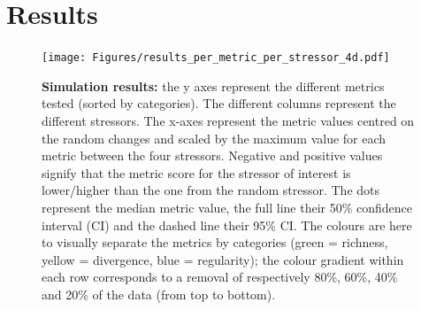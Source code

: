 \documentclass[12pt,letterpaper]{article}
\providecommand{\DIFaddbeginFL}{} %
\providecommand{\DIFdelbeginFL}{} %
\providecommand{\DIFdelendFL}{} %
\newcommand{\DIFscaledelfig}{0.5}
\newlength{\DIFdelgraphicswidth} %
\newlength{\DIFdelgraphicsheight} %
\newcommand{\DIFaddincludegraphics}[2][]{{\color{blue}\fbox{\DIFOincludegraphics[#1]{#2}}}} %
\newcommand{\DIFdelincludegraphics}[2][]{%
\sbox{\DIFdelgraphicsbox}{\DIFOincludegraphics[#1]{#2}}%
\settoboxwidth{\DIFdelgraphicswidth}{\DIFdelgraphicsbox} %
\settoboxtotalheight{\DIFdelgraphicsheight}{\DIFdelgraphicsbox} %
\scalebox{\DIFscaledelfig}{%
\parbox[b]{\DIFdelgraphicswidth}{\usebox{\DIFdelgraphicsbox}\\[-\baselineskip] \rule{\DIFdelgraphicswidth}{0em}}\llap{\resizebox{\DIFdelgraphicswidth}{\DIFdelgraphicsheight}{%
\setlength{\unitlength}{\DIFdelgraphicswidth}%
\begin{picture}(1,1)%
\thicklines\linethickness{2pt} %
{\color[rgb]{1,0,0}\put(0,0){\framebox(1,1){}}}%
{\color[rgb]{1,0,0}\put(0,0){\line( 1,1){1}}}%
{\color[rgb]{1,0,0}\put(0,1){\line(1,-1){1}}}%
\end{picture}%
}\hspace*{3pt}}} %
} %
\DeclareRobustCommand{\DIFaddbeginFL}{\DIFOaddbeginFL \let\includegraphics\DIFaddincludegraphics} %
\DeclareRobustCommand{\DIFdelbeginFL}{\DIFOdelbeginFL \let\includegraphics\DIFdelincludegraphics} %
\DeclareRobustCommand{\DIFdelendFL}{\DIFOaddendFL \let\includegraphics\DIFOincludegraphics} %
\begin{document}
\section{Results}

\begin{figure}[!htbp]
\centering
   \texttt{[image: Figures/results\_per\_metric\_per\_stressor\_4d.pdf]}
\caption{\DIFdelbeginFL %
\DIFdelendFL \DIFaddbeginFL \scriptsize{\textbf{Simulation results:} the y axes represent the different metrics tested (sorted by categories).
The different columns represent the different stressors. The x-axes represent the metric values centred on the random changes and scaled by the maximum value for each metric between the four stressors.
Negative and positive values signify that the metric score for the stressor of interest is lower/higher than the one from the random stressor.
The dots represent the median metric value, the full line their 50\% confidence interval (CI) and the dashed line their 95\% CI.
The colours are here to visually separate the metrics by categories (green = richness, yellow = divergence, blue = regularity); the colour gradient within each row corresponds to a removal of respectively 80\%, 60\%, 40\% and 20\% of the data (from top to bottom).
}}
\end{figure}
\end{document}
